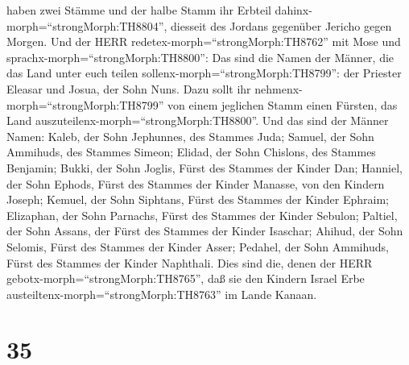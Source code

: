 haben zwei Stämme und der halbe Stamm ihr Erbteil
dahinx-morph=``strongMorph:TH8804'', diesseit des Jordans gegenüber
Jericho gegen Morgen.  Und der HERR
redetex-morph=``strongMorph:TH8762'' mit Mose und
sprachx-morph=``strongMorph:TH8800'':  Das sind die Namen
der Männer, die das Land unter euch teilen
sollenx-morph=``strongMorph:TH8799'': der Priester Eleasar und Josua,
der Sohn Nuns.  Dazu sollt ihr
nehmenx-morph=``strongMorph:TH8799'' von einem jeglichen Stamm einen
Fürsten, das Land auszuteilenx-morph=``strongMorph:TH8800''.
 Und das sind der Männer Namen: Kaleb, der Sohn Jephunnes,
des Stammes Juda;  Samuel, der Sohn Ammihuds, des Stammes
Simeon;  Elidad, der Sohn Chislons, des Stammes Benjamin;
 Bukki, der Sohn Joglis, Fürst des Stammes der Kinder Dan;
 Hanniel, der Sohn Ephods, Fürst des Stammes der Kinder
Manasse, von den Kindern Joseph;  Kemuel, der Sohn
Siphtans, Fürst des Stammes der Kinder Ephraim;  Elizaphan,
der Sohn Parnachs, Fürst des Stammes der Kinder Sebulon; 
Paltiel, der Sohn Assans, der Fürst des Stammes der Kinder Isaschar;
 Ahihud, der Sohn Selomis, Fürst des Stammes der Kinder
Asser;  Pedahel, der Sohn Ammihuds, Fürst des Stammes der
Kinder Naphthali.  Dies sind die, denen der HERR
gebotx-morph=``strongMorph:TH8765'', daß sie den Kindern Israel Erbe
austeiltenx-morph=``strongMorph:TH8763'' im Lande Kanaan.

\hypertarget{section-34}{%
\section{35}\label{section-34}}

